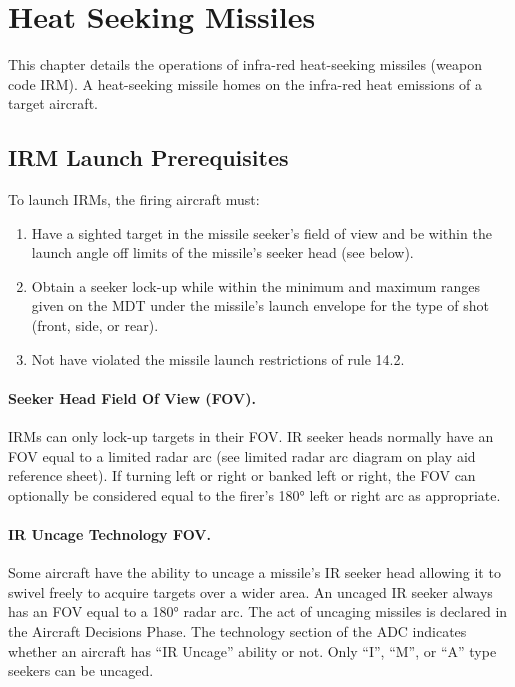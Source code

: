 \section{Heat Seeking Missiles}

This chapter details the operations of infra-red heat-seeking missiles (weapon code IRM). A heat-seeking missile homes on the infra-red heat emissions of a target aircraft.

\subsection{IRM Launch Prerequisites}

To launch IRMs, the firing aircraft must:

\begin{enumerate}
    \item Have a sighted target in the missile seeker's field of view and be within the launch angle off limits of the missile's seeker head (see below).
    \item Obtain a seeker lock-up while within the minimum and maximum ranges given on the MDT under the missile's launch envelope for the type of shot (front, side, or rear).
    \item Not have violated the missile launch restrictions of rule 14.2.
\end{enumerate}

\paragraph{Seeker Head Field Of View (FOV).} IRMs can only lock-up targets in their FOV. IR seeker heads normally have an FOV equal to a limited radar arc (see limited radar arc diagram on play aid reference sheet). If turning left or right or banked left or right, the FOV can optionally be considered equal to the firer’s 180° left or right arc as appropriate. 

\paragraph{IR Uncage Technology FOV.} Some aircraft have the ability to uncage a missile's IR seeker head allowing it to swivel freely to acquire targets over a wider area. An uncaged IR seeker always has an FOV equal to a 180° radar arc. The act of uncaging missiles is declared in the Aircraft Decisions Phase. The technology section of the ADC indicates whether an aircraft has “IR Uncage” ability or not. Only “I”, “M”, or “A” type seekers can be uncaged.

